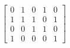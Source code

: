 \documentclass[preview]{standalone}
\begin{document}
\begin{align*}
\begin{bmatrix} 0 & 1 & 0 & 1 & 0 \\ 1 & 1 & 1 & 0 & 1 \\ 0 & 0 & 1 & 1 & 0 \\ 1 & 0 & 0 & 0 & 1 \end{bmatrix}
\end{align*}
\end{document}
